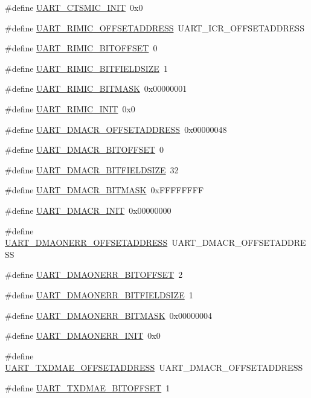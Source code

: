 \begin{DoxyCompactItemize}
\item 
\#define \hyperlink{a00575_a650a216938467f1f0ab8149abef56dbc}{UART\_\-CTSMIC\_\-INIT}~0x0
\item 
\#define \hyperlink{a00575_a74cb0e3ae3e8c3310f3c942796b0a2f3}{UART\_\-RIMIC\_\-OFFSETADDRESS}~UART\_\-ICR\_\-OFFSETADDRESS
\item 
\#define \hyperlink{a00575_ab90eef6dac8b5827f16d2e509b14861d}{UART\_\-RIMIC\_\-BITOFFSET}~0
\item 
\#define \hyperlink{a00575_ae88a59d372401269fd485f863e0c8373}{UART\_\-RIMIC\_\-BITFIELDSIZE}~1
\item 
\#define \hyperlink{a00575_af145cd586e58b38b9ec85703ba1e9da2}{UART\_\-RIMIC\_\-BITMASK}~0x00000001
\item 
\#define \hyperlink{a00575_a96d1360da5ae755741ac072f2e064c6c}{UART\_\-RIMIC\_\-INIT}~0x0
\item 
\#define \hyperlink{a00575_acb19b7d77fa9715167a7124a99f69f8e}{UART\_\-DMACR\_\-OFFSETADDRESS}~0x00000048
\item 
\#define \hyperlink{a00575_a2a63ba635654a1e69b449e1491bbbcca}{UART\_\-DMACR\_\-BITOFFSET}~0
\item 
\#define \hyperlink{a00575_a39bcf78220b89d5d6682cbf6d42208d6}{UART\_\-DMACR\_\-BITFIELDSIZE}~32
\item 
\#define \hyperlink{a00575_a837605ba26727ab18f37ea1db914aa66}{UART\_\-DMACR\_\-BITMASK}~0xFFFFFFFF
\item 
\#define \hyperlink{a00575_a3b6d337ed5eec50b25096a7374a4ea72}{UART\_\-DMACR\_\-INIT}~0x00000000
\item 
\#define \hyperlink{a00575_a377608baaa4c133e03a4f758f385db2a}{UART\_\-DMAONERR\_\-OFFSETADDRESS}~UART\_\-DMACR\_\-OFFSETADDRESS
\item 
\#define \hyperlink{a00575_ad1bddbd805d0eb3b2608393efeaff62f}{UART\_\-DMAONERR\_\-BITOFFSET}~2
\item 
\#define \hyperlink{a00575_a39554a5bfe5d3f41c5fb35385c15f850}{UART\_\-DMAONERR\_\-BITFIELDSIZE}~1
\item 
\#define \hyperlink{a00575_a528b1da474f7b5f2e395a0edb047ca97}{UART\_\-DMAONERR\_\-BITMASK}~0x00000004
\item 
\#define \hyperlink{a00575_a2c1d8823cc82445db71632edb897e5cd}{UART\_\-DMAONERR\_\-INIT}~0x0
\item 
\#define \hyperlink{a00575_ab2dba76575a549b2319cf9f03bfb827a}{UART\_\-TXDMAE\_\-OFFSETADDRESS}~UART\_\-DMACR\_\-OFFSETADDRESS
\item 
\#define \hyperlink{a00575_a043a775d60773a4775a21e24e9d31839}{UART\_\-TXDMAE\_\-BITOFFSET}~1

\end{DoxyCompactItemize}
